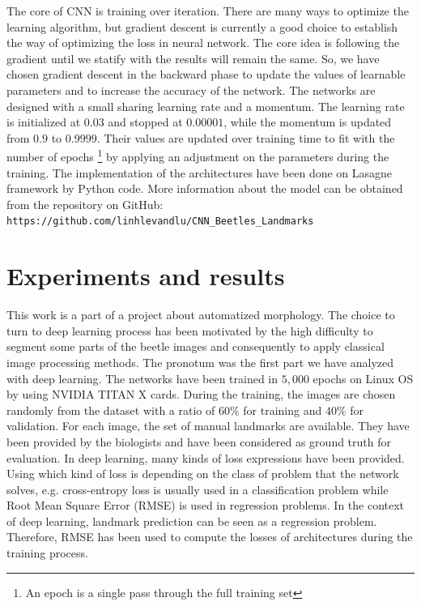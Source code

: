 \documentclass[review]{elsarticle}
\begin{document}
The core of CNN is training over iteration. There are many ways to optimize the learning algorithm, but gradient descent \cite{lecun2012efficient} is currently a good choice to establish the way of optimizing the loss in neural network. The core idea is following the gradient until we statify with the results will remain the same. So, we have chosen gradient descent in the backward phase to update the values of learnable parameters and to increase the accuracy of the network. The networks are designed with a small sharing learning rate and a momentum. The learning rate is initialized at $0.03$ and stopped at $0.00001$, while the momentum is updated from $0.9$ to $0.9999$. Their values are updated over training time to fit with the number of epochs \footnote{An epoch is a single pass through the full training set} by applying an adjustment on the parameters during the training. The implementation of the architectures have been done on Lasagne framework \cite{lasagne} by Python code. More information about the model can be obtained from the repository on GitHub: \texttt{https://github.com/linhlevandlu/CNN\_Beetles\_Landmarks}

\section{Experiments and results}
\label{sexperiments}
This work is a part of a project about automatized morphology. The choice to turn to deep learning process has been motivated by the high difficulty to segment some parts of the beetle images and consequently to apply classical image processing methods. The pronotum was the first part we have analyzed with deep learning. The networks have been trained in $5, 000$ epochs on Linux OS by using NVIDIA TITAN X cards. During the training, the images are chosen randomly from the dataset with a ratio of $60\%$ for training and $40\%$ for validation. For each image, the set of manual landmarks are available. They have been provided by the biologists and have been considered as ground truth for evaluation. In deep learning, many kinds of loss expressions have been provided. Using which kind of loss is depending on the class of problem that the network solves, e.g. cross-entropy loss is usually used in a classification problem while Root Mean Square Error (RMSE) is used in regression problems. In the context of deep learning, landmark prediction can be seen as a regression problem. Therefore, RMSE has been used to compute the losses of architectures during the training process. 
\end{document}
